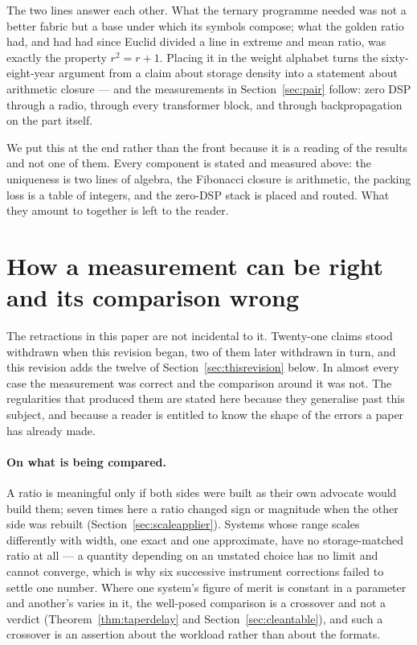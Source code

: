 \documentclass[11pt]{article}
\theoremstyle{definition}
\begin{document}
The two lines answer each other. What the ternary programme needed was not a
better fabric but a base under which its symbols compose; what the golden ratio
had, and had had since Euclid divided a line in extreme and mean ratio, was
exactly the property $r^2 = r + 1$. Placing it in the weight alphabet turns the
sixty-eight-year argument from a claim about storage density into a statement
about arithmetic closure --- and the measurements in Section~\ref{sec:pair}
follow: zero DSP through a radio, through every transformer block, and through
backpropagation on the part itself.

We put this at the end rather than the front because it is a reading of the
results and not one of them. Every component is stated and measured above:
the uniqueness is two lines of algebra, the Fibonacci closure is arithmetic, the
packing loss is a table of integers, and the zero-DSP stack is placed and routed.
What they amount to together is left to the reader.


\section{How a measurement can be right and its comparison wrong}
\label{sec:selfcheck}

The retractions in this paper are not incidental to it. Twenty-one claims stood
withdrawn when this revision began, two of them later withdrawn in turn, and this
revision adds the twelve of Section~\ref{sec:thisrevision} below. In almost every
case the measurement was correct and the comparison around it was not. The
regularities that produced them are stated here because they generalise past this
subject, and because a reader is entitled to know the shape of the errors a paper
has already made.

\paragraph{On what is being compared.} A ratio is meaningful only if both sides
were built as their own advocate would build them; seven times here a ratio
changed sign or magnitude when the other side was rebuilt
(Section~\ref{sec:scaleapplier}). Systems whose range scales differently with
width, one exact and one approximate, have no storage-matched ratio at all --- a
quantity depending on an unstated choice has no limit and cannot converge, which
is why six successive instrument corrections failed to settle one number. Where
one system's figure of merit is constant in a parameter and another's varies in
it, the well-posed comparison is a crossover and not a verdict
(Theorem~\ref{thm:taperdelay} and Section~\ref{sec:cleantable}), and such a
crossover is an assertion about the workload rather than about the formats.
\end{document}
